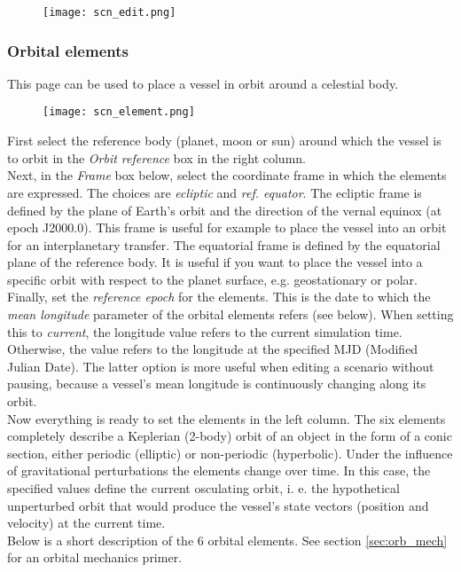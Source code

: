\documentclass[Orbiter User Manual.tex]{subfiles}
\begin{document}

\begin{figure}[H]
	\centering
	\texttt{[image: scn\_edit.png]}
\end{figure}

\subsubsection{Orbital elements}
This page can be used to place a vessel in orbit around a celestial body.

\begin{figure}[H]
	\centering
	\texttt{[image: scn\_element.png]}
\end{figure}

\noindent
First select the reference body (planet, moon or sun) around which the vessel is to orbit in the \textit{Orbit reference} box in the right column.\\
Next, in the \textit{Frame} box below, select the coordinate frame in which the elements are expressed. The choices are \textit{ecliptic} and \textit{ref. equator}. The ecliptic frame is defined by the plane of Earth's orbit and the direction of the vernal equinox (at epoch J2000.0). This frame is useful for example to place the vessel into an orbit for an interplanetary transfer. The equatorial frame is defined by the equatorial plane of the reference body. It is useful if you want to place the vessel into a specific orbit with respect to the planet surface, e.g. geostationary or polar.\\
Finally, set the \textit{reference epoch} for the elements. This is the date to which the \textit{mean longitude} parameter of the orbital elements refers (see below). When setting this to \textit{current}, the longitude value refers to the current simulation time. Otherwise, the value refers to the longitude at the specified MJD (Modified Julian Date). The latter option is more useful when editing a scenario without pausing, because a vessel's mean longitude is continuously changing along its orbit.\\
Now everything is ready to set the elements in the left column. The six elements completely describe a Keplerian (2-body) orbit of an object in the form of a conic section, either periodic (elliptic) or non-periodic (hyperbolic). Under the influence of gravitational perturbations the  elements change over time. In this case, the specified values define the current osculating orbit, i. e. the hypothetical unperturbed orbit that would produce the vessel's state vectors (position and velocity) at the current time.\\
Below is a short description of the 6 orbital elements. See section \ref{sec:orb_mech} for an orbital mechanics primer.
\end{document}
